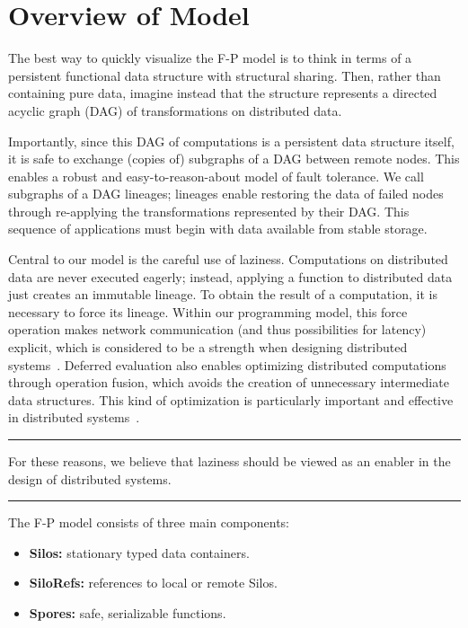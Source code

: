 \documentclass{sigplanconf}
\theoremstyle{definition}
\theoremstyle{definition}
\begin{document}
\section{Overview of Model}

The best way to quickly visualize the F-P model is to think in terms of a
persistent functional data structure with structural sharing. Then, rather
than containing pure data, imagine instead that the structure represents a
directed acyclic graph (DAG) of transformations on distributed data.

Importantly, since this DAG of computations is a persistent data structure
itself, it is safe to exchange (copies of) subgraphs of a DAG between remote
nodes. This enables a robust and easy-to-reason-about model of fault
tolerance. We call subgraphs of a DAG lineages; lineages enable restoring the
data of failed nodes through re-applying the transformations represented by
their DAG. This sequence of applications must begin with data available from
stable storage.

Central to our model is the careful use of laziness. Computations on
distributed data are never executed eagerly; instead, applying a function to
distributed data just creates an immutable lineage. To obtain the result of a
computation, it is necessary to force its lineage. Within our programming
model, this force operation makes network communication (and thus
possibilities for latency) explicit, which is considered to be a strength when
designing distributed systems~\cite{ANoteDistComp}. Deferred evaluation also
enables optimizing distributed computations through operation fusion, which
avoids the creation of unnecessary intermediate data structures. This kind of
optimization is particularly important and effective in distributed
systems~\cite{FlumeJava}.

\vspace{-3mm}
\begin{center}\noindent\rule{8cm}{0.4pt}\end{center}
\begin{displayquote}
For these reasons, we believe that laziness should be viewed as an enabler in
the design of distributed systems.
\end{displayquote}
\vspace{-4mm}
\begin{center}\noindent\rule{8cm}{0.4pt}\end{center}
\vspace{1mm}

\noindent The F-P model consists of three main components:
\begin{itemize}[noitemsep]
  \item {\bf Silos:} stationary typed data containers.
  \item {\bf SiloRefs:} references to local or remote Silos.
  \item {\bf Spores:} safe, serializable functions.
\end{itemize}
\vspace{1mm}
\end{document}
